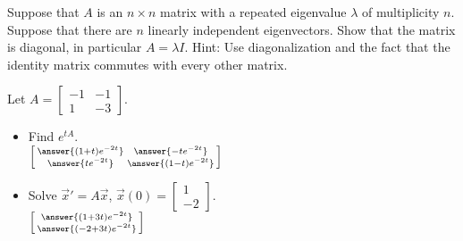 \documentclass{ximera}
\begin{document}
\begin{exercise}
    Suppose that $A$ is an $n \times n$ matrix with a repeated eigenvalue $\lambda$ of multiplicity $n$. Suppose that there are $n$ linearly independent eigenvectors.  Show that the matrix is diagonal, in particular $A = \lambda I$.  Hint: Use diagonalization and the fact that the identity matrix commutes with every other matrix.
\end{exercise}

\begin{exercise}
    Let $A = 
    \left[\begin{smallmatrix}
        -1 & -1 \\
        1 & -3
    \end{smallmatrix} \right]$.
    \begin{itemize}
    \item Find $e^{tA}$.\\
        $\left[\begin{smallmatrix} \answer{(1+t)e^{-2t}} & \answer{-te^{-2t}} \\ \answer{te^{-2t}} & \answer{(1-t)e^{-2t}} \end{smallmatrix}\right]$
    \item Solve ${\vec{x}}' = A \vec{x}$, $\vec{x}(0) =
        \left[ \begin{smallmatrix}
            1 \\
            -2
        \end{smallmatrix} \right]$.\\
        $\left[\begin{smallmatrix} \answer{(1+3t)e^{-2t}} \\ \answer{(-2 + 3t)e^{-2t}} \end{smallmatrix}\right]$
    \end{itemize}
\end{exercise}
\end{document}
